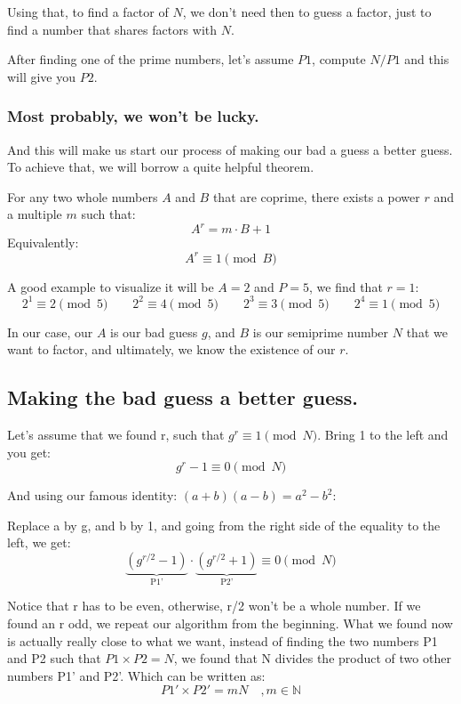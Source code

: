 \begin{notebox}
    Using that, to find a factor of $N$, we don’t need then to guess a factor, just to find a number that shares factors with $ N$.
\end{notebox}

After finding one of the prime numbers, let’s assume $P1$, compute $N/P1$ and this will give you $P2$.

\subsubsection{Most probably, we won’t be lucky.}
And this will make us start our process of making our bad a guess a better guess. To achieve that, we will borrow a quite helpful theorem.
\begin{theorembox}
    For any two whole numbers $A$ and $B$ that are coprime, there exists a power $r$ and a multiple $m$ such that:$$A^r = m \cdot B + 1$$
    Equivalently: $$A^r \equiv 1\pmod B$$
\end{theorembox}

A good example to visualize it will be $A = 2$ and $P = 5$, we find that $r = 1$:
$$
2^1 \equiv 2 \pmod{5} \qquad
2^2 \equiv 4 \pmod{5} \qquad
2^3 \equiv 3 \pmod{5} \qquad
2^4 \equiv 1 \pmod{5}
$$

In our case, our $A$ is our bad guess $g$, and $B$ is our semiprime number $N$ that we want to factor, and ultimately, we know the existence of our $r$.

\subsection{Making the bad guess a better guess.}

Let’s assume that we found r, such that $g^r \equiv 1 \pmod{N}$. Bring 1 to the left and you get:
$$
g^r - 1 \equiv 0\pmod{N}
$$

And using our famous identity: $(a + b)(a - b) = a^2 - b^2$:

Replace a by g, and b by 1, and going from the right side of the equality to the left, we get:
$$
\underbrace{(g^{r/2} - 1)}_{\text{P1'}} \cdot \underbrace{(g^{r/2} + 1)}_{\text{P2'}} \equiv 0\pmod{N}
$$

Notice that r has to be even, otherwise, r/2 won’t be a whole number. If we found an r odd, we repeat our algorithm from the beginning.\nl
What we found now is actually really close to what we want, instead of finding the two numbers P1 and P2 such that $P1 \times P2 = N$, we found that N divides the product of two other numbers P1’ and P2’. Which can be written as:
$$
P1' \times P2' = mN \quad , m \in \mathbb{N}
$$

